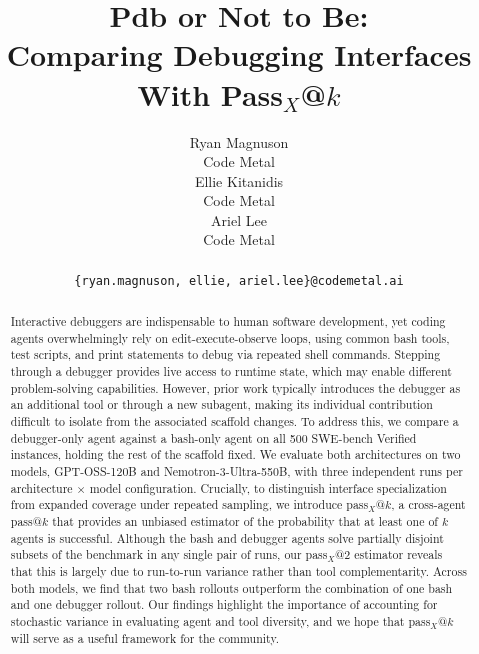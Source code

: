 \documentclass{article}
\title{Pdb or Not to Be: \\ Comparing Debugging Interfaces With Pass$_{X}$@$k$}
\author{%
  Ryan Magnuson \\
  Code Metal \\
  \And
  Ellie Kitanidis \\
  Code Metal \\
  \And
  Ariel Lee \\
  Code Metal \\
  \AND \\
  \texttt{\{ryan.magnuson, ellie, ariel.lee\}@codemetal.ai} }
\begin{document}
\maketitle


\begin{abstract}
Interactive debuggers are indispensable to human software development, yet coding agents overwhelmingly rely on edit-execute-observe loops, using common bash tools, test scripts, and print statements to debug via repeated shell commands. Stepping through a debugger provides live access to runtime state, which may enable different problem-solving capabilities. However, prior work typically introduces the debugger as an additional tool or through a new subagent, making its individual contribution difficult to isolate from the associated scaffold changes. To address this, we compare a debugger-only agent against a bash-only agent on all 500 SWE-bench Verified instances, holding the rest of the scaffold fixed. We evaluate both architectures on two models, GPT-OSS-120B and Nemotron-3-Ultra-550B, with three independent runs per architecture $\times$ model configuration. Crucially, to distinguish interface specialization from expanded coverage under repeated sampling, we introduce pass$_X$@$k$, a cross-agent pass@$k$ that provides an unbiased estimator of the probability that at least one of $k$ agents is successful. Although the bash and debugger agents solve partially disjoint subsets of the benchmark in any single pair of runs, our pass$_X$@$2$ estimator reveals that this is largely due to run-to-run variance rather than tool complementarity. Across both models, we find that two bash rollouts outperform the combination of one bash and one debugger rollout. Our findings highlight the importance of accounting for stochastic variance in evaluating agent and tool diversity, and we hope that pass$_X$@$k$ will serve as a useful framework for the community.

\end{abstract}
\end{document}
